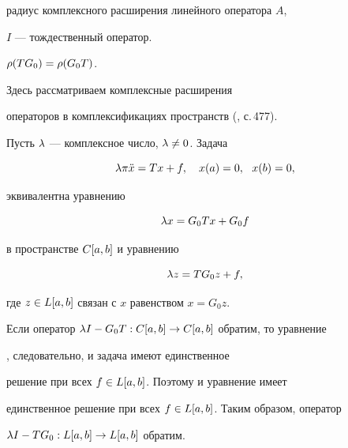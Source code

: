 радиус комплексного расширения линейного оператора $A$,


$I$ --- тождественный оператор.








\begin{lem}\label{l1}


$\rho(TG_0)=\rho(G_0T)$.


\end{lem}





\begin{pf}


Здесь рассматриваем комплексные расширения


операторов в комплексификациях пространств (\cite{KA}, с.\,477).


Пусть $\lambda$ --- комплексное число, $\lambda\ne0$.  Задача


\begin{equation}\label{w1}


\l\pi\Ddot x=Tx+f,\quad x(a)=0,\ \ x(b)=0,


\end{equation}


эквивалентна уравнению


\begin{equation}\label{w2}


\l x=G_0Tx+G_0f


\end{equation}


в пространстве $C[a,b]$ и уравнению


\begin{equation}\label{w3}


\l z=TG_0 z+f,


\end{equation}


где $z\in L[a,b]$ связан с $x$ равенством $x=G_0z$.





Если оператор $\lambda I-G_0T:C[a,b]\to C[a,b]$ обратим, то уравнение


, следовательно, и задача  имеют единственное


решение при всех $f\in L[a,b]$. Поэтому и уравнение  имеет


единственное решение при всех $f\in L[a,b]$. Таким образом, оператор


$\lambda I-TG_0:L[a,b]\to L[a,b]$ обратим.






\end{pf}
